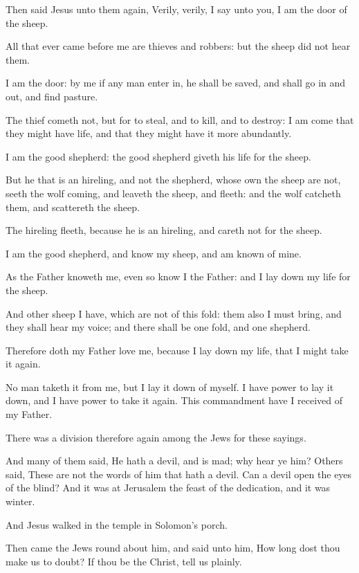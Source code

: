 \Verse Then said Jesus unto them again, Verily, verily, I say unto you, I am the door of the sheep.

\Verse All that ever came before me are thieves and robbers: but the sheep did not hear them.

\Verse I am the door: by me if any man enter in, he shall be saved, and shall go in and out, and find pasture.

\Verse The thief cometh not, but for to steal, and to kill, and to destroy: I am come that they might have life, and that they might have it more abundantly.

\Verse I am the good shepherd: the good shepherd giveth his life for the sheep.

\Verse But he that is an hireling, and not the shepherd, whose own the sheep are not, seeth the wolf coming, and leaveth the sheep, and fleeth: and the wolf catcheth them, and scattereth the sheep.

\Verse The hireling fleeth, because he is an hireling, and careth not for the sheep.

\Verse I am the good shepherd, and know my sheep, and am known of mine.

\Verse As the Father knoweth me, even so know I the Father: and I lay down my life for the sheep.

\Verse And other sheep I have, which are not of this fold: them also I must bring, and they shall hear my voice; and there shall be one fold, and one shepherd.

\Verse Therefore doth my Father love me, because I lay down my life, that I might take it again.

\Verse No man taketh it from me, but I lay it down of myself. I have power to lay it down, and I have power to take it again. This commandment have I received of my Father.

\Verse There was a division therefore again among the Jews for these sayings.

\Verse And many of them said, He hath a devil, and is mad; why hear ye him?  \Verse Others said, These are not the words of him that hath a devil. Can a devil open the eyes of the blind?  \Verse And it was at Jerusalem the feast of the dedication, and it was winter.

\Verse And Jesus walked in the temple in Solomon's porch.

\Verse Then came the Jews round about him, and said unto him, How long dost thou make us to doubt? If thou be the Christ, tell us plainly.


